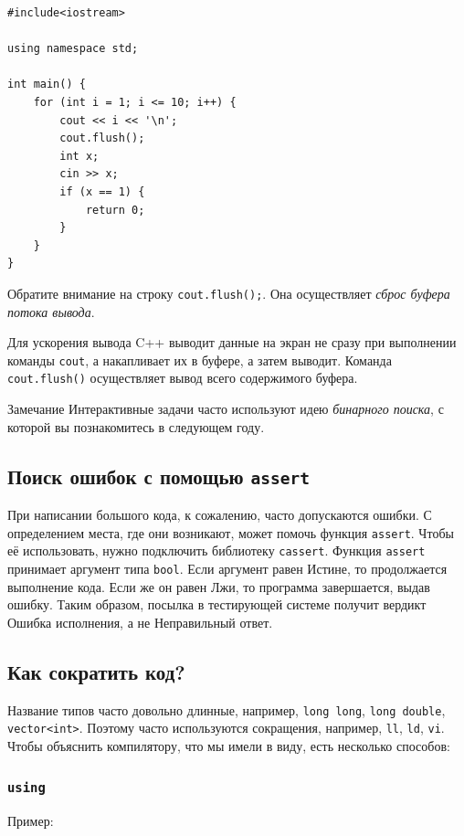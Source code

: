 \documentclass{article}
\newcommand{\note}[1]{
	\begin{sectionenv}[yellow!30!white]{Замечание}
		#1
	\end{sectionenv}
}
\begin{document}
	\begin{lstlisting}
#include<iostream>

using namespace std;

int main() {
	for (int i = 1; i <= 10; i++) {
		cout << i << '\n';
		cout.flush();
		int x;
		cin >> x;
		if (x == 1) {
			return 0;
		}
	}
}
	\end{lstlisting}

	Обратите внимание на строку \texttt{cout.flush();}. Она осуществляет \textit{сброс буфера потока вывода}.

	Для ускорения вывода C++ выводит данные на экран не сразу при выполнении команды \texttt{cout}, а накапливает их в буфере, а затем выводит. Команда \texttt{cout.flush()} осуществляет вывод всего содержимого буфера.

	\note{Интерактивные задачи часто используют идею \textit{бинарного поиска}, с которой вы познакомитесь в следующем году.}

	\subsection{Поиск ошибок с помощью \texttt{assert}}

	При написании большого кода, к сожалению, часто допускаются ошибки. С определением места, где они возникают, может помочь функция \texttt{assert}. Чтобы её использовать, нужно подключить библиотеку \texttt{cassert}. Функция \texttt{assert} принимает аргумент типа \texttt{bool}. Если аргумент равен Истине, то продолжается выполнение кода. Если же он равен Лжи, то программа завершается, выдав ошибку. Таким образом, посылка в тестирующей системе получит вердикт Ошибка исполнения, а не Неправильный ответ.

	\subsection{Как сократить код?}

	Название типов часто довольно длинные, например, \texttt{long long}, \texttt{long double}, \texttt{vector<int>}. Поэтому часто используются сокращения, например, \texttt{ll}, \texttt{ld}, \texttt{vi}. Чтобы объяснить компилятору, что мы имели в виду, есть несколько способов:

	\subsubsection{\texttt{using}}

	Пример:
\end{document}
